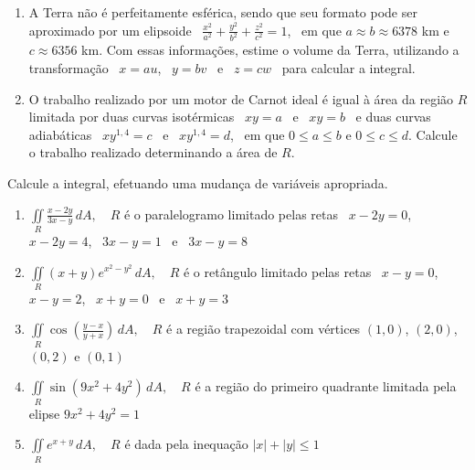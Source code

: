 	\begin{enumerate}[resume]
		
		\item A Terra não é perfeitamente esférica, sendo que seu formato pode ser aproximado por um elipsoide \, $\displaystyle \frac{x^2}{a^2} + \frac{y^2}{b^2} + \frac{z^2}{c^2} = 1$, \, em que $a \approx b \approx 6378$ km e $c \approx 6356$ km. Com essas informações, estime o volume da Terra, utilizando a transformação \, $x = au$, \, $ y = bv$ \, e \, $z = cw$ \, para calcular a integral.
		
		\item O trabalho realizado por um motor de Carnot ideal é igual à área da região $R$ limitada por duas curvas isotérmicas \, $xy = a$ \, e \, $xy = b$ \, e duas curvas adiabáticas \, $xy^{1,4} = c$ \, e \, $xy^{1,4} = d$, \, em que $0 \leq a \leq b$ e $0 \leq c \leq d$. Calcule o trabalho realizado determinando a área de $R$.\\
		
	\end{enumerate}
	
	\vspace{5mm}
	
	Calcule a integral, efetuando uma mudança de variáveis apropriada.
	
	\begin{enumerate}[resume]
	
		\item $\displaystyle \iint \limits_R \frac{x - 2y}{3x - y} \, dA, \quad R$ é o paralelogramo limitado pelas retas \, $x - 2y = 0$, \, $x - 2y = 4$, \, $3x - y = 1$ \, e \, $3x - y = 8$
		
		\item $\displaystyle \iint \limits_R (x + y)e^{x^2 - y^2} \, dA, \quad R$ é o retângulo limitado pelas retas \, $x - y = 0$, \, $x - y = 2$, \, $ x + y = 0$ \, e \, $x + y = 3$
		
		\item $\displaystyle \iint \limits_R \cos \left(\frac{y-x}{y+x}\right) \, dA, \quad R$ é a região trapezoidal com vértices $(1,0)$, $(2,0)$, $(0,2)$ e $(0,1)$\\
		
		\item $\displaystyle \iint \limits_R \sin(9x^2 + 4y^2) \, dA, \quad R$ é a região do primeiro quadrante limitada pela elipse $9x^2 + 4y^2 = 1$
		
		\item $\displaystyle \iint \limits_R e^{x+y} \, dA, \quad R$ é dada pela inequação $|x| + |y| \leq 1$
	
	\end{enumerate}
		
	\vspace{5mm}	
	
	


